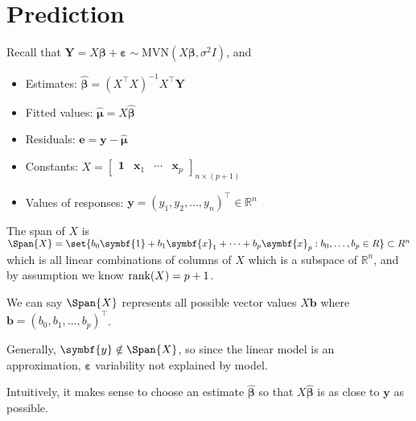 \section{Prediction}
Recall that $ \symbf{Y}=X\symbf{\beta}+\symbf{\varepsilon}
    \sim \text{MVN}(X\symbf{\beta},\sigma^2 I) $, and
\begin{itemize}
    \item Estimates: $ \hat{\symbf{\beta}}=(X^\top X)^{-1}X^\top \symbf{Y} $
    \item Fitted values: $ \hat{\symbf{\mu}}=X\hat{\symbf{\beta}} $
    \item Residuals: $ \symbf{e}=\symbf{y}-\hat{\symbf{\mu}} $
    \item Constants: $ X=\begin{bmatrix}
                  \symbf{1} & \symbf{x}_1 & \cdots & \symbf{x}_p
              \end{bmatrix}_{n\times(p+1)} $
    \item Values of responses: $
              \symbf{y}=(y_1,y_2,\ldots,y_n)^\top \in\mathbb{R}^n $
\end{itemize}

The span of $ X $ is $ \Span{X}=
    \set{b_0\symbf{1}+b_1\symbf{x}_1+\cdots+b_p\symbf{x}_p:b_0,\ldots,b_p\in\mathbb{R}}
    \subset \mathbb{R}^n $
which is all linear combinations of columns of $ X $ which is a subspace
of $ \mathbb{R}^n $, and by assumption we know $ \operatorname{rank}(X)=p+1 $.

We can say $ \Span{X} $ represents all possible vector
values $ X\symbf{b} $ where $ \symbf{b}=(b_0,b_1,\ldots,b_p)^\top $.

Generally, $ \symbf{y}\notin\Span{X} $, so since
the linear model is an approximation, $ \symbf{\varepsilon} $
variability not explained by model.

Intuitively, it makes sense to choose an estimate
$ \hat{\symbf{\beta}} $ so that $ X\hat{\symbf{\beta}} $
is as close to $ \symbf{y} $ as possible.

